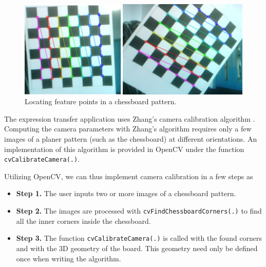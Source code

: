 \documentclass[11pt,a4paper,twoside]{report}
\begin{document}
\begin{figure}[H]
\begin{centering}
\includegraphics[scale=0.48]{images/chessboard_pattern.png}
\par\end{centering}

\caption{Locating feature points in a chessboard pattern.}
\label{fg:chessboard}

\end{figure}

The expression transfer application uses Zhang's camera calibration algorithm
\cite{zhang}. Computing the camera parameters with Zhang's algorithm requires
only a few images of a planer pattern (such as the chessboard) at different
orientations. An implementation of this algorithm is provided in OpenCV under the
function \texttt{cvCalibrateCamera(.)}. 

Utilizing OpenCV, we can thus implement camera calibration in a few steps as
\begin{itemize}
\item \textbf{Step 1.} The user inputs two or more images of a chessboard
  pattern.
\item \textbf{Step 2.} The images are processed with
  \texttt{cvFindChessboardCorners(.)} to find all the inner corners inside the
  chessboard.
\item \textbf{Step 3.} The function \texttt{cvCalibrateCamera(.)} is called with
  the found corners and with the 3D geometry of the board. This geometry need
  only be defined once when writing the algorithm.
\end{itemize}
\end{document}
